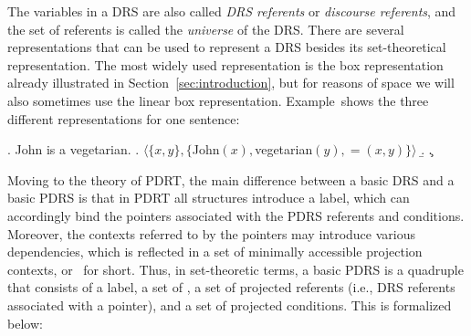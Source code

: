 \noindent The variables in a DRS are also called \textit{DRS referents} or
\textit{discourse referents}, and the set of referents is called the
\textit{universe} of the DRS.  There are several representations that can be
used to represent a DRS besides its set-theoretical representation. The most
widely used representation is the box representation already illustrated in
Section~\ref{sec:introduction}, but for reasons of space we will also
sometimes use the linear box representation. Example~\Next shows the three
different representations for one sentence:

\ex. John is a vegetarian.
\a. $\langle \{x, y\},\{$John$(x),$vegetarian$(y), =(x,y)\}\rangle$
\b. 
\c. 

Moving to the theory of PDRT, the main difference between a basic DRS and
a basic PDRS is that in PDRT all structures introduce a label, which can
accordingly bind the pointers associated with the PDRS referents and
conditions.  Moreover, the contexts referred to by the pointers may
introduce various dependencies, which is reflected in a set of minimally
accessible projection contexts, or \MAPs~for short. Thus, in set-theoretic
terms, a basic PDRS is a quadruple that consists of a label, a set of \MAPs,
a set of projected referents (i.e., DRS referents associated with
a pointer), and a set of projected conditions.  This is formalized below:


